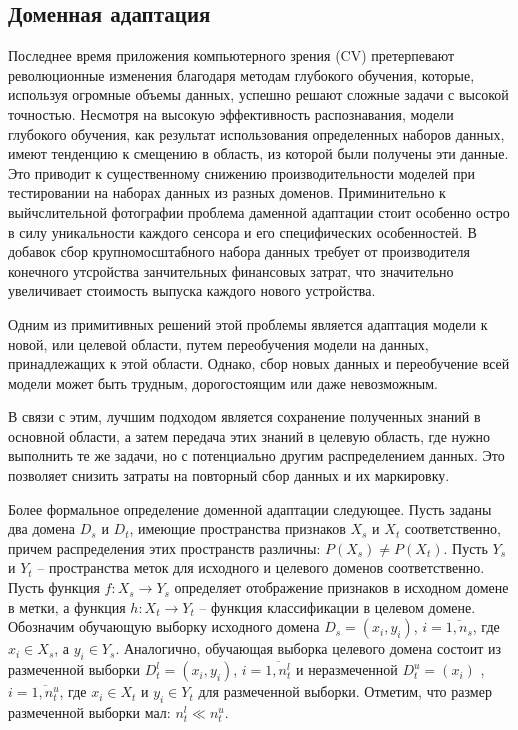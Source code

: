 \subsection{Доменная адаптация}\label{sect-1-4}

Последнее время приложения компьютерного зрения (CV) претерпевают революционные изменения благодаря методам глубокого обучения, которые, используя огромные объемы данных, успешно решают сложные задачи с высокой точностью. Несмотря на высокую эффективность распознавания, модели глубокого обучения, как результат использования определенных наборов данных, имеют тенденцию к смещению в область, из которой были получены эти данные. Это приводит к существенному снижению производительности моделей при тестировании на наборах данных из разных доменов. Приминительно к выйчслительной фотографии проблема даменной адаптации стоит особенно остро в силу уникальности каждого сенсора и его специфических особенностей. В добавок сбор крупномосштабного набора данных требует от производителя конечного утсройства занчительных финансовых затрат, что значительно увеличивает стоимость выпуска каждого нового устройства.

Одним из примитивных решений этой проблемы является адаптация модели к новой, или целевой области, путем переобучения модели на данных, принадлежащих к этой области. Однако, сбор новых данных и переобучение всей модели может быть трудным, дорогостоящим или даже невозможным. 

В связи с этим, лучшим подходом является сохранение полученных знаний в основной области, а затем передача этих знаний в целевую область, где нужно выполнить те же задачи, но с потенциально другим распределением данных. Это позволяет снизить затраты на повторный сбор данных и их маркировку.


Более формальное определение доменной адаптации следующее. Пусть заданы два домена $D_s$ и $D_t$, имеющие пространства признаков $X_s$ и $X_t$ соответственно, причем распределения этих пространств различны: $P(X_s) \neq P(X_t)$. Пусть $Y_s$ и $Y_t$ -- пространства меток для исходного и целевого доменов соответственно. Пусть функция $f: X_s \rightarrow Y_s$ определяет отображение признаков в исходном домене в метки, а функция $h: X_t \rightarrow Y_t$ -- функция классификации в целевом домене. Обозначим обучающую выборку исходного домена $D_s = (x_i, y_i)$, $i=\overline{1, n_s}$, где $x_i \in X_s$, а $y_i \in Y_s$. Аналогично, обучающая выборка целевого домена состоит из размеченной выборки $D_t^l =(x_i, y_i)$, $i=\overline{1, n_t^l}$ и неразмеченной $D_t^u = (x_i)$ , $i=\overline{1, n_t^u}$, где $x_i \in X_t$ и $y_i \in Y_t$ для размеченной выборки. Отметим, что размер размеченной выборки мал: $n_t^l \ll n_t^u$. 

